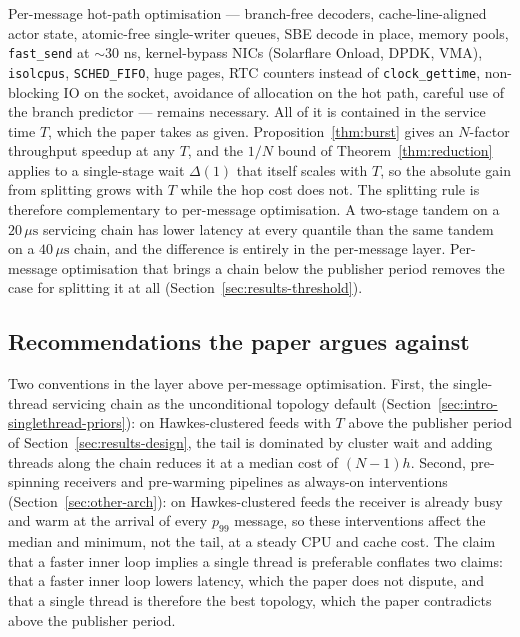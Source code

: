 \documentclass[11pt]{article}
\begin{document}
Per-message hot-path optimisation --- branch-free decoders, cache-line-aligned
actor state, atomic-free single-writer queues, SBE decode in place, memory pools,
\texttt{fast\_send} at $\sim 30$ ns, kernel-bypass NICs (Solarflare Onload, DPDK, VMA),
\texttt{isolcpus}, \texttt{SCHED\_FIFO}, huge pages, RTC counters instead of
\texttt{clock\_gettime}, non-blocking IO on the socket, avoidance of allocation on the hot
path, careful use of the branch predictor --- remains necessary. All of it is contained
in the service time $T$, which the paper takes as given.
Proposition~\ref{thm:burst} gives an $N$-factor throughput speedup at any $T$, and the
$1/N$ bound of Theorem~\ref{thm:reduction} applies to a single-stage wait $\Delta(1)$
that itself scales with $T$, so the absolute gain from splitting grows with $T$ while
the hop cost does not. The splitting rule is therefore complementary to per-message optimisation. A two-stage
tandem on a $20\,\mu\mathrm{s}$ servicing chain has lower latency at every quantile than
the same tandem on a $40\,\mu\mathrm{s}$ chain, and the difference is entirely in the
per-message layer. Per-message optimisation that brings a chain below the publisher period
removes the case for splitting it at all (Section~\ref{sec:results-threshold}).

\subsection{Recommendations the paper argues against}

Two conventions in the layer above per-message optimisation. First, the single-thread
servicing chain as the unconditional topology default (Section~\ref{sec:intro-singlethread-priors}): on
Hawkes-clustered feeds with $T$ above the publisher period of Section~\ref{sec:results-design}, the
tail is dominated by cluster wait and adding threads along the chain reduces it at a
median cost of $(N-1)h$. Second, pre-spinning receivers and pre-warming pipelines as
always-on interventions (Section~\ref{sec:other-arch}): on Hawkes-clustered feeds the
receiver is already busy and warm at the arrival of every $p_{99}$ message, so these
interventions affect the median and minimum, not the tail, at a steady CPU and cache cost.
The claim that a faster inner loop implies a single thread is preferable conflates two
claims: that a faster inner loop lowers latency, which the paper does not dispute, and
that a single thread is therefore the best topology, which the paper contradicts above
the publisher period.
\end{document}
